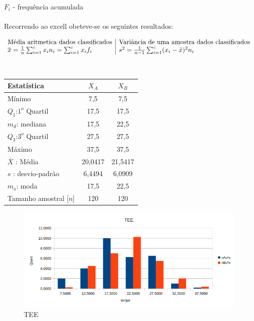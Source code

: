 $F_i$ - frequência acumulada \quad
\\
\\
Recorrendo ao excell obeteve-se os seguintes resultados: \\
\begin{minipage}{0pt}
$$\begin{array}{l | l}
\text{Média aritmetica dados classificados} & \text{Variância de uma amostra dados classificados} \\
\overline{x} = \frac{1}{n}\sum_{i=1}^cx_in_i = \sum_{i=1}^cx_if_i & s^2 = \frac{1}{n-1}\sum_{i=1}^c (x_i-\bar{x})^2 n_i
\end{array}$$
\end{minipage}
\\
\begin{minipage}[!b]{0.40\linewidth}
\begin{tabular}{ l c c }
\hline
Estatística & $X_A$ & $X_B$ \\
\hline
Mínimo & 7,5 & 7,5\\
$Q_1$:$1^o$ Quartil & 17,5 & 17,5 \\
$m_d$: mediana & 17,5 & 22,5\\
$Q_3$:$3^o$ Quartil & 27,5 & 27,5 \\
Máximo & 37,5 & 37,5 \\
\hline
$\bar{X}$ : Média & 20,0417 & 21,5417 \\
$s$ : desvio-padrão & 6,4494 & 6,0909\\
$m_o$: moda & 17,5 & 22,5\\
\hline
Tamanho amostral [$n$] & 120 & 120 \\
\hline
\end{tabular}
\label{Tab:Resulatdos}
\end{minipage}
\hspace{2cm}
\begin{minipage}[!b]{0.40\linewidth}
\begin{figure}[H]
\centering
\includegraphics[scale=0.5]{./image/TEE.png}
\caption{TEE}
\label{TEE}
\end{figure}
\end{minipage}
